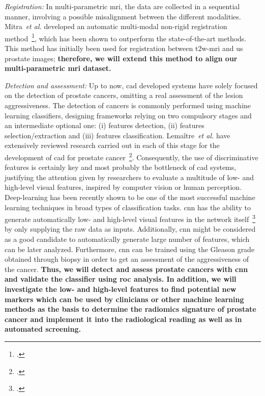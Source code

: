 \emph{Registration:}
In multi-parametric \ac{mri}, the data are collected in a sequential manner, involving a possible misalignment between the different modalities.
Mitra~\emph{et al.} developed an automatic multi-modal non-rigid registration method~\footcite{Mitra2012a}, which has been shown to outperform the state-of-the-art methods.
This method has initially been used for registration between \ac{t2w}-\ac{mri} and \ac{us} prostate images; \textbf{therefore, we will extend this method to align our multi-parametric \ac{mri} dataset.}

\emph{Detection and assessment:}
Up to now, \ac{cad} developed systems have solely focused on the detection of prostate cancers, omitting a real assessment of the lesion aggressiveness.
The detection of cancers is commonly performed using machine learning classifiers, designing frameworks relying on two compulsory stages and an intermediate optional one: (i) features detection, (ii) features selection/extraction and (iii) features classification.
Lema\^itre~\emph{et al.} have extensively reviewed research carried out in each of this stage for the development of \ac{cad} for prostate cancer~\footcite{Lemaitre2015}.
Consequently, the use of discriminative features is certainly key and most probably the bottleneck of \ac{cad} systems, justifying the attention given by researchers to evaluate a multitude of low- and high-level visual features, inspired by computer vision or human perception.
Deep-learning has been recently shown to be one of the most successful machine learning techniques in broad types of classification tasks.
\ac{cnn} has the ability to generate automatically low- and high-level visual features in the network itself~\footcite{Zeiler2013} by only supplying the raw data as inputs.
Additionally, \ac{cnn} might be considered as a good candidate to automatically generate large number of features, which can be later analyzed.
Furthermore, \ac{cnn} can be trained using the Gleason grade obtained through biopsy in order to get an assessment of the aggressiveness of the cancer.
\textbf{Thus, we will detect and assess prostate cancers with \ac{cnn} and validate the classifier using \ac{roc} analysis.
  In addition, we will investigate the low- and high-level features to find potential new markers which can be used by clinicians or other machine learning methods as the basis to determine the radiomics signature of prostate cancer and implement it into the radiological reading as well as in automated screening.}

